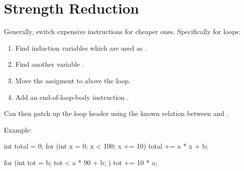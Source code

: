 \documentclass[a4paper, 11pt]{article}
\begin{document}
\section*{Strength Reduction}
{
    Generally, switch expensive instructions for cheaper ones. Specifically for loops:

    \begin{enumerate}
    \item Find induction variables which are used as .
    \item Find another variable .
    \item Move the assigment  to above the loop.
    \item Add an end-of-loop-body instruction .
    \end{enumerate}

    Can then patch up the loop header using the known relation between  and .

    Example:

    \begin{minipage}[t]{0.45\textwidth}
    \begin{monospacefigure}
    int total = 0;
    for (int x = 0; x < 100; x += 10)
        total += a * x + b;
    \end{monospacefigure}
    \end{minipage}
    \hspace{5mm}
    \begin{minipage}[t]{0.45\textwidth}
    \begin{monospacefigure}
    for (int tot = b; tot < a * 90 + b; )
        tot += 10 * a;
    \end{monospacefigure}
    \end{minipage}
}
\end{document}
